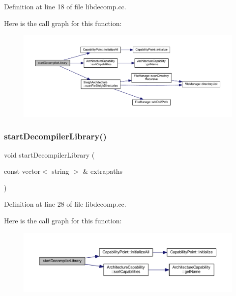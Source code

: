 Definition at line 18 of file libdecomp.\+cc.

Here is the call graph for this function\+:
\nopagebreak
\begin{figure}[H]
\begin{center}
\leavevmode
\includegraphics[width=350pt]{libdecomp_8hh_acfd4067a6eec02a6fe97d05439b7e176_cgraph}
\end{center}
\end{figure}
\mbox{\label{libdecomp_8hh_a3bca24bcfcd70f728dcd33e26fb23240}} 
\subsubsection{\texorpdfstring{startDecompilerLibrary()}{startDecompilerLibrary()}\hspace{0.1cm}{\footnotesize\ttfamily [2/3]}}
{\footnotesize\ttfamily void start\+Decompiler\+Library (\begin{DoxyParamCaption}\item[{const vector$<$ string $>$ \&}]{extrapaths }\end{DoxyParamCaption})}



Definition at line 28 of file libdecomp.\+cc.

Here is the call graph for this function\+:
\nopagebreak
\begin{figure}[H]
\begin{center}
\leavevmode
\includegraphics[width=350pt]{libdecomp_8hh_a3bca24bcfcd70f728dcd33e26fb23240_cgraph}
\end{center}
\end{figure}
\mbox{\label{libdecomp_8hh_ac9748283f19f6d8692e4d806a3cf267e}} 
